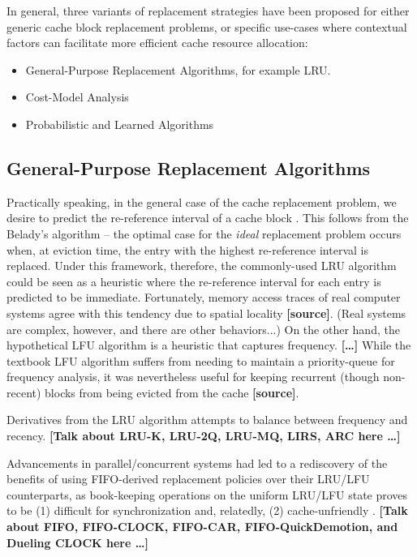 \documentclass{article}
\begin{document}
In general, three variants of replacement strategies have been proposed for either
generic cache block replacement problems, or specific use-cases where contextual
factors can facilitate more efficient cache resource allocation:
\begin{itemize}
    \item General-Purpose Replacement Algorithms, for example LRU.
    \item Cost-Model Analysis
    \item Probabilistic and Learned Algorithms
\end{itemize}

\subsection{General-Purpose Replacement Algorithms}
Practically speaking, in the general case of the cache replacement problem,
we desire to predict the re-reference interval of a cache block
\cite{Jaleel_etal.RRIP.2010}. This follows from the Belady's algorithm -- the
optimal case for the \emph{ideal} replacement problem occurs when, at eviction
time, the entry with the highest re-reference interval is replaced. Under this
framework, therefore, the commonly-used LRU algorithm could be seen as a heuristic
where the re-reference interval for each entry is predicted to be immediate.
Fortunately, memory access traces of real computer systems agree with this
tendency due to spatial locality \textbf{[source]}. (Real systems are complex,
however, and there are other behaviors...) On the other hand, the hypothetical
LFU algorithm is a heuristic that captures frequency. \textbf{[\dots]} While the
textbook LFU algorithm suffers from needing to maintain a priority-queue for
frequency analysis, it was nevertheless useful for keeping recurrent (though
non-recent) blocks from being evicted from the cache \textbf{[source]}.

Derivatives from the LRU algorithm attempts to balance between frequency and
recency. \textbf{[Talk about LRU-K, LRU-2Q, LRU-MQ, LIRS, ARC here \dots]}

Advancements in parallel/concurrent systems had led to a rediscovery of the benefits
of using FIFO-derived replacement policies over their LRU/LFU counterparts, as
book-keeping operations on the uniform LRU/LFU state proves to be (1) difficult
for synchronization and, relatedly, (2) cache-unfriendly \cite{Yang_etal.FIFO-LPQD.2023}.
\textbf{[Talk about FIFO, FIFO-CLOCK, FIFO-CAR, FIFO-QuickDemotion, and Dueling
CLOCK here \dots]}
\end{document}

